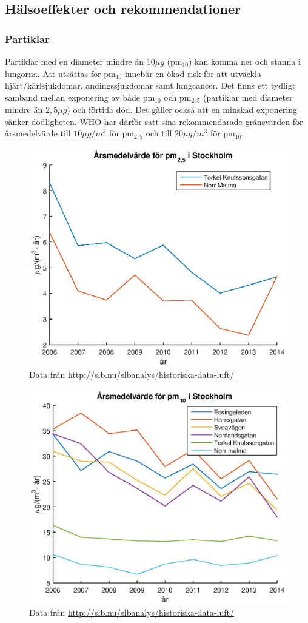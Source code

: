 \subsection{Hälsoeffekter och rekommendationer}
\subsubsection{Partiklar}
Partiklar med en diameter mindre än $10 \mu g$ (pm$_{10}$) kan komma ner och stanna i lungorna. Att utsättas för pm$_{10}$ innebär en ökad risk för att utväckla hjärt/kärlsjukdomar, andingssjukdomar samt lungcancer. Det finns ett tydligt samband mellan exponering av både pm$_{10}$ och pm$_{2,5}$ (partiklar med diameter mindre än $2,5 \mu g$) och förtida död. Det gäller också att en minskad exponering sänker dödligheten. WHO har därför satt sina rekommendarade gränsvärden för årsmedelvärde till $10 \mu g/m^3$ för pm$_{2,5}$ och till $20 \mu g/m^3$ för pm$_{10}$.
\cite{whoAir}
\begin{figure}
	\centering
	\includegraphics[width=.8\textwidth]{Bilder/pm25sth}
	\caption{Data från \url{http://slb.nu/slbanalys/historiska-data-luft/}}
	\label{fig:pm25sth}
\end{figure}

\begin{figure}
	\centering
	\includegraphics[width=.8\textwidth]{Bilder/pm10sth}
	\caption{Data från \url{http://slb.nu/slbanalys/historiska-data-luft/}}
	\label{fig:pm10sth}
\end{figure}

